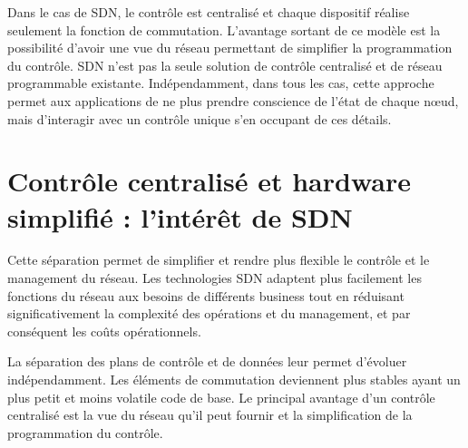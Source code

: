 Dans le cas de SDN, le contrôle est centralisé et chaque dispositif réalise seulement la fonction de commutation. L'avantage sortant de ce modèle est la possibilité d'avoir une vue du réseau permettant de simplifier la programmation du contrôle. SDN n'est pas la seule solution de contrôle centralisé et de réseau programmable existante. Indépendamment, dans tous les cas, cette approche permet aux applications de ne plus prendre conscience de l'état de chaque nœud, mais d'interagir avec un contrôle unique s'en occupant de ces détails. \cite{sdnbookControlDataPlanes}




\section{Contrôle centralisé et hardware simplifié : l'intérêt de SDN}



Cette séparation permet de simplifier et rendre plus flexible le contrôle et le management du réseau. Les technologies SDN adaptent plus facilement les fonctions du réseau aux besoins de différents business tout en réduisant significativement la complexité des opérations et du management, et par conséquent les coûts opérationnels. \cite{sndChineseBookConceptsApplications}


La séparation des plans de contrôle et de données leur permet d'évoluer indépendamment. Les éléments de commutation deviennent plus stables ayant un plus petit et moins volatile code de base. 
Le principal avantage d'un contrôle centralisé est la vue du réseau qu'il peut fournir et la simplification de la programmation du contrôle.

